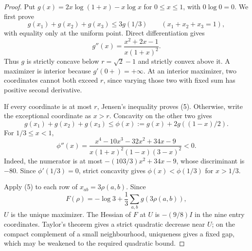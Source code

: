 \documentclass[11pt,a4paper]{article}
\theoremstyle{plain}
\theoremstyle{definition}
\theoremstyle{remark}
\begin{document}
\label{pf:entropy}
\lementropy*
\begin{proof}
Put $g(x)=2x\log(1+x)-x\log x$ for $0\le x\le1$, with $0\log0=0$.
We first prove
\[
 g(x_1)+g(x_2)+g(x_3)\le3g(1/3)\qquad(x_1+x_2+x_3=1),           \tag{5}
\]
with equality only at the uniform point.  Direct differentiation gives
\[
 g''(x)=\frac{x^2+2x-1}{x(1+x)^2}.
\]
Thus $g$ is strictly concave below $r=\sqrt2-1$ and strictly convex above it.  A
maximizer is interior because $g'(0+)=+\infty$.  At an interior maximizer, two
coordinates cannot both exceed $r$, since varying those two with fixed sum has positive
second derivative.

If every coordinate is at most $r$, Jensen's inequality proves (5).  Otherwise, write
the exceptional coordinate as $x>r$.  Concavity on the other two gives
\[
 g(x_1)+g(x_2)+g(x_3)\le \phi(x):=g(x)+2g((1-x)/2).
\]
For $1/3\le x<1$,
\[
 \phi''(x)=
 \frac{x^4-10x^3-32x^2+34x-9}{x(1+x)^2(1-x)(3-x)^2}<0.
\]
Indeed, the numerator is at most $-(103/3)x^2+34x-9$, whose discriminant is $-80$.
Since $\phi'(1/3)=0$, strict concavity gives $\phi(x)<\phi(1/3)$ for $x>1/3$.

Apply (5) to each row of $x_{ab}=3\rho(a,b)$.  Since
\[
 F(\rho)=-\log3+\frac13\sum_{a,b}g(3\rho(a,b)),
\]
$U$ is the unique maximizer.  The Hessian of $F$ at $U$ is $-(9/8)I$ in the nine
entry coordinates.  Taylor's theorem gives a strict quadratic decrease near $U$;
on the compact complement of a small neighbourhood, uniqueness gives a fixed gap,
which may be weakened to the required quadratic bound.
\end{proof}
\end{document}
